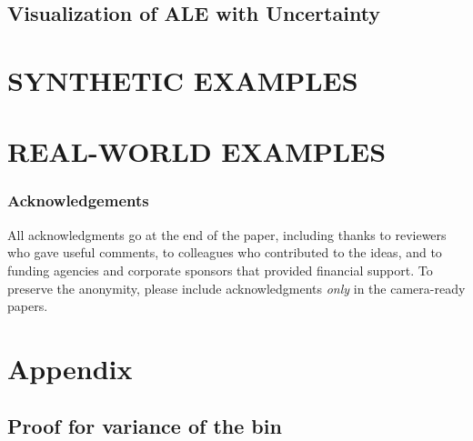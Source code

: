 \documentclass[twoside]{article}
\begin{document}
\subsection{Visualization of ALE with Uncertainty}

\section{SYNTHETIC EXAMPLES}

\section{REAL-WORLD EXAMPLES}


\subsubsection*{Acknowledgements}
All acknowledgments go at the end of the paper, including thanks to reviewers who gave useful comments, to colleagues who contributed to the ideas, and to funding agencies and corporate sponsors that provided financial support. 
To preserve the anonymity, please include acknowledgments \emph{only} in the camera-ready papers.




\section*{Appendix}

\subsection{Proof for variance of the bin}
\end{document}

